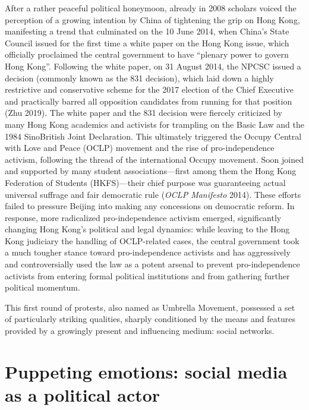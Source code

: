 \documentclass[
  a4paper,
]{book}
\begin{document}
After a rather peaceful political honeymoon, already in 2008 scholars voiced the perception of a growing intention by China of tightening the grip on Hong Kong, manifesting a trend that culminated on the 10 June 2014, when China's State Council issued for the first time a white paper on the Hong Kong issue, which officially proclaimed the central government to have ``plenary power to govern Hong Kong''. Following the white paper, on 31 August 2014, the NPCSC issued a decision (commonly known as the 831 decision), which laid down a highly restrictive and conservative scheme for the 2017 election of the Chief Executive and practically barred all opposition candidates from running for that position {(Zhu 2019)}. The white paper and the 831 decision were fiercely criticized by many Hong Kong academics and activists for trampling on the Basic Law and the 1984 SinoBritish Joint Declaration. This ultimately triggered the Occupy Central with Love and Peace (OCLP) movement and the rise of pro-independence activism, following the thread of the international Occupy movement. Soon joined and supported by many student associations---first among them the Hong Kong Federation of Students (HKFS)---their chief purpose was guaranteeing actual universal suffrage and fair democratic rule {(\emph{{OCLP Manifesto}} 2014)}. These efforts failed to pressure Beijing into making any concessions on democratic reform. In response, more radicalized pro-independence activism emerged, significantly changing Hong Kong's political and legal dynamics: while leaving to the Hong Kong judiciary the handling of OCLP-related cases, the central government took a much tougher stance toward pro-independence activists and has aggressively and controversially used the law as a potent arsenal to prevent pro-independence activists from entering formal political institutions and from gathering further political momentum.

This first round of protests, also named as Umbrella Movement, possessed a set of particularly striking qualities, sharply conditioned by the means and features provided by a growingly present and influencing medium: social networks.

\hypertarget{puppeting-emotions-social-media-as-a-political-actor}{%
\section{Puppeting emotions: social media as a political actor}\label{puppeting-emotions-social-media-as-a-political-actor}}
\end{document}
